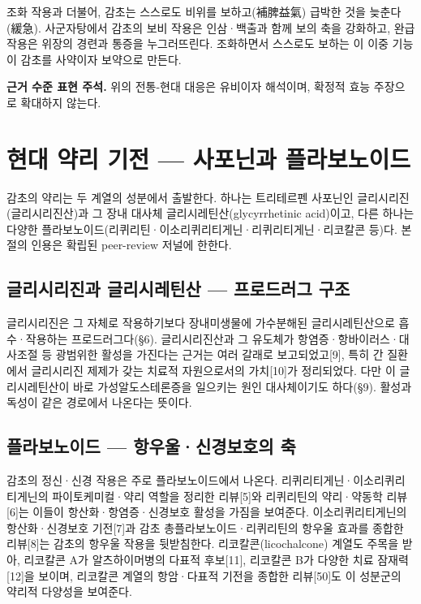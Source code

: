 \documentclass[12pt,oneside]{book}
\newenvironment{authnote}
  {\par\smallskip\begingroup\leftskip=6mm\rightskip=3mm\small\color{muted}\noindent\ignorespaces}
  {\par\endgroup\smallskip}
\begin{document}
조화 작용과 더불어, 감초는 스스로도 비위를 보하고(補脾益氣) 급박한 것을 늦춘다(緩急). 사군자탕에서 감초의 보비 작용은 인삼·백출과 함께 보의 축을 강화하고, 완급 작용은 위장의 경련과 통증을 누그러뜨린다. 조화하면서 스스로도 보하는 이 이중 기능이 감초를 사약이자 보약으로 만든다.

\begin{authnote}\textbf{근거 수준 표현 주석.} 위의 전통-현대 대응은 유비이자 해석이며, 확정적 효능 주장으로 확대하지 않는다.\end{authnote}

\section{현대 약리 기전 — 사포닌과 플라보노이드}

감초의 약리는 두 계열의 성분에서 출발한다. 하나는 트리테르펜 사포닌인 글리시리진(글리시리진산)과 그 장내 대사체 글리시레틴산(glycyrrhetinic acid)이고, 다른 하나는 다양한 플라보노이드(리퀴리틴·이소리퀴리티게닌·리퀴리티게닌·리코칼콘 등)다. 본 절의 인용은 확립된 peer-review 저널에 한한다.

\subsection{글리시리진과 글리시레틴산 — 프로드러그 구조}

글리시리진은 그 자체로 작용하기보다 장내미생물에 가수분해된 글리시레틴산으로 흡수·작용하는 프로드러그다(§6). 글리시리진산과 그 유도체가 항염증·항바이러스·대사조절 등 광범위한 활성을 가진다는 근거는 여러 갈래로 보고되었고[9], 특히 간 질환에서 글리시리진 제제가 갖는 치료적 자원으로서의 가치[10]가 정리되었다. 다만 이 글리시레틴산이 바로 가성알도스테론증을 일으키는 원인 대사체이기도 하다(§9). 활성과 독성이 같은 경로에서 나온다는 뜻이다.

\subsection{플라보노이드 — 항우울·신경보호의 축}

감초의 정신·신경 작용은 주로 플라보노이드에서 나온다. 리퀴리티게닌·이소리퀴리티게닌의 파이토케미컬·약리 역할을 정리한 리뷰[5]와 리퀴리틴의 약리·약동학 리뷰[6]는 이들이 항산화·항염증·신경보호 활성을 가짐을 보여준다. 이소리퀴리티게닌의 항산화·신경보호 기전[7]과 감초 총플라보노이드·리퀴리틴의 항우울 효과를 종합한 리뷰[8]는 감초의 항우울 작용을 뒷받침한다. 리코칼콘(licochalcone) 계열도 주목을 받아, 리코칼콘 A가 알츠하이머병의 다표적 후보[11], 리코칼콘 B가 다양한 치료 잠재력[12]을 보이며, 리코칼콘 계열의 항암·다표적 기전을 종합한 리뷰[50]도 이 성분군의 약리적 다양성을 보여준다.
\end{document}
